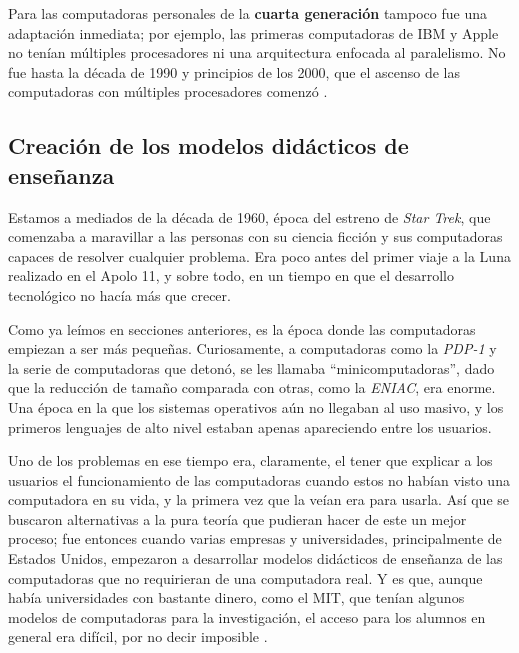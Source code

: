 \documentclass[letterpaper,12pt,oneside]{book}
\begin{document}
		Para las computadoras personales de la \textbf{cuarta generación} tampoco fue una adaptación inmediata; por ejemplo, las primeras computadoras de IBM y Apple no tenían
		múltiples procesadores ni una arquitectura enfocada al paralelismo. No fue hasta la década de 1990 y principios de los 2000, que el ascenso de las computadoras con múltiples procesadores comenzó \cite{tanenbaum_modern_2002}.

		
		
		\clearpage		
		
		\subsection{Creación de los modelos didácticos de enseñanza}
		
		Estamos a mediados de la década de 1960, época del estreno de \textit{Star Trek}, que comenzaba a maravillar a las personas con su ciencia ficción  y sus
		computadoras capaces de resolver cualquier problema. Era poco antes del primer viaje a la Luna realizado en el Apolo 11, y sobre todo,
		en un tiempo en que el desarrollo tecnológico no hacía más que crecer.
  
        Como ya leímos en secciones
		anteriores,
		es la época donde las computadoras empiezan a ser más pequeñas. Curiosamente, a computadoras como la \textit{PDP-1} y la serie de computadoras que detonó, se les llamaba
		``minicomputadoras'', dado que la reducción de tamaño comparada con otras, como la \textit{ENIAC}, era enorme. Una época en la que
		los sistemas operativos aún no llegaban al uso masivo, y los primeros lenguajes de alto nivel estaban apenas apareciendo entre los usuarios. 
  
        Uno de los 
		problemas en ese tiempo era, claramente, el tener que explicar
		a los usuarios el funcionamiento de las computadoras cuando estos no habían visto una computadora en su vida, y la primera vez que la veían era para usarla. Así que se buscaron alternativas a la pura teoría que pudieran hacer de este un mejor proceso; fue entonces cuando varias empresas 
		y universidades, principalmente de Estados Unidos, empezaron a desarrollar modelos didácticos de enseñanza de las computadoras que no requirieran de una computadora 
		real. Y es que, aunque había universidades con bastante dinero, como el MIT, que tenían algunos modelos de computadoras para la investigación, 
		el acceso para los alumnos en general era difícil, por no decir imposible \cite[p. 71]{ceruzzi_computing_2012}.
  
\end{document}
